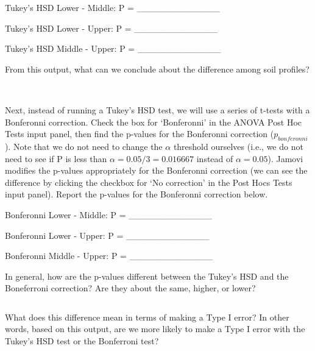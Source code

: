 \documentclass[
]{scrbook}
\begin{document}
Tukey's HSD Lower - Middle: P = \_\_\_\_\_\_\_\_\_\_\_\_\_

Tukey's HSD Lower - Upper: P = \_\_\_\_\_\_\_\_\_\_\_\_\_

Tukey's HSD Middle - Upper: P = \_\_\_\_\_\_\_\_\_\_\_\_\_

From this output, what can we conclude about the difference among soil profiles?

\begin{verbatim}


\end{verbatim}

Next, instead of running a Tukey's HSD test, we will use a series of t-tests with a Bonferonni correction.
Check the box for `Bonferonni' in the ANOVA Post Hoc Tests input panel, then find the p-values for the Bonferonni correction (\(p_{bonferonni}\)).
Note that we do not need to change the \(\alpha\) threshold ourselves (i.e., we do not need to see if P is less than \(\alpha = 0.05/3 = 0.016667\) instead of \(\alpha = 0.05\)).
Jamovi modifies the p-values appropriately for the Bonferonni correction (we can see the difference by clicking the checkbox for `No correction' in the Post Hocs Tests input panel).
Report the p-values for the Bonferonni correction below.

Bonferonni Lower - Middle: P = \_\_\_\_\_\_\_\_\_\_\_\_\_

Bonferonni Lower - Upper: P = \_\_\_\_\_\_\_\_\_\_\_\_\_

Bonferonni Middle - Upper: P = \_\_\_\_\_\_\_\_\_\_\_\_\_

In general, how are the p-values different between the Tukey's HSD and the Boneferroni correction?
Are they about the same, higher, or lower?

\begin{verbatim}
\end{verbatim}

What does this difference mean in terms of making a Type I error?
In other words, based on this output, are we more likely to make a Type I error with the Tukey's HSD test or the Bonferroni test?

\begin{verbatim}

\end{verbatim}
\end{document}

